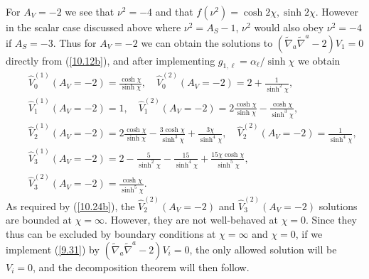 For $A_V=-2$ we see that $\nu^2=-4$ and that $f(\nu^2)=\cosh 2\chi,\sinh 2\chi$. However in the scalar case discussed above where $\nu^2=A_S-1$, $\nu^2$ would also obey $\nu^2=-4$ if $A_S=-3$. Thus for $A_V=-2$ we can obtain the solutions to $(\tilde{\nabla}_a\tilde{\nabla}^a-2)V_1=0$ directly from (\ref{10.12b}), and after implementing $g_{1,\ell}=\alpha_{\ell}/\sinh\chi$ we  obtain 
%
\begin{eqnarray}
&&\hat{V}^{(1)}_0(A_V=-2)=\frac{\cosh\chi}{\sinh\chi},\quad \hat{V}^{(2)}_0(A_V=-2)=2+\frac{1}{\sinh^2\chi},
\nonumber\\
&&\hat{V}^{(1)}_1(A_V=-2)=1,\quad \hat{V}^{(2)}_1(A_V=-2)=2\frac{\cosh\chi}{\sinh\chi}-\frac{\cosh\chi}{\sinh^3\chi},
\nonumber\\
&&\hat{V}^{(1)}_2(A_V=-2)=2\frac{\cosh\chi}{\sinh\chi}-\frac{3\cosh\chi}{\sinh^3\chi}+\frac{3\chi}{\sinh^4\chi},\quad \hat{V}^{(2)}_2(A_V=-2)=\frac{1}{\sinh^4\chi},
\nonumber\\
&&\hat{V}^{(1)}_3(A_V=-2)=2-\frac{5}{\sinh^2\chi}-\frac{15}{\sinh^4\chi}+\frac{15\chi\cosh\chi}{\sinh^5\chi},
\nonumber\\
&& \hat{V}^{(2)}_3(A_V=-2)=\frac{\cosh\chi}{\sinh^5\chi}.
\label{10.29b}
\end{eqnarray}
%
As required by (\ref{10.24b}), the $\hat{V}^{(2)}_2(A_V=-2)$ and $\hat{V}^{(2)}_3(A_V=-2)$ solutions  are bounded at  $\chi=\infty$. However, they are not well-behaved at $\chi=0$. Since they thus can  be excluded by boundary conditions at $\chi=\infty$ and $\chi=0$, if we implement (\ref{9.31}) by $(\tilde{\nabla}_a\tilde{\nabla}^a-2)V_i=0$,  the only allowed solution will be $V_i=0$, and the decomposition theorem will then follow.

